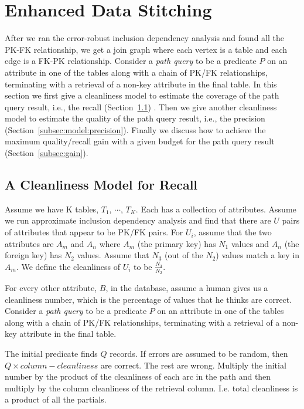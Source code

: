

\section{Enhanced Data Stitching}\label{sec:enhancedstitching}


After we ran the error-robust inclusion dependency analysis and found all the PK-FK relationship, we get a join graph where each vertex is a table and each edge is a FK-PK relationship. Consider a \emph{path query} to be a predicate $P$ on an attribute in one of the tables along with a chain of PK/FK relationships, terminating with a retrieval of a non-key attribute in the final table. 
In this section we first give a cleanliness model to estimate the coverage of the path query result, i.e., the recall (Section~\ref{subsec:model:recall}) . Then we give another cleanliness model to estimate the quality of the path query result, i.e., the precision (Section~\ref{subsec:model:precision}). Finally we discuss how to achieve the maximum quality/recall gain with a given budget for the path query result (Section~\ref{subsec:gain}).

\subsection{A Cleanliness Model for Recall}\label{subsec:model:recall}

Assume we have K tables, $T_1$, $\cdots$, $T_K$.  Each has a collection of attributes. Assume we run approximate inclusion dependency analysis and find that there are $U$ pairs of attributes that appear to be PK/FK pairs.  For $U_i$, assume that the two attributes are $A_m$ and $A_n$ where $A_m$ (the primary key) has $N_1$ values and $A_n$ (the foreign key) has $N_2$ values. Assume that $N_3$ (out of the $N_2$) values match a key in $A_m$. We define the cleanliness of $U_i$ to be $\frac{N_3}{N_2}$.

For every other attribute, $B$, in the database, assume a human gives us a cleanliness number, which is the percentage of values that he thinks are correct. Consider a \emph{path query} to be a predicate $P$ on an attribute in one of the tables along with a chain of PK/FK relationships, terminating with a retrieval of a non-key attribute in the final table.

The initial predicate finds $Q$ records. If errors are assumed to be random, then $Q \times column-cleanliness$ are correct. The rest are wrong.  Multiply the initial number by the product of the cleanliness of each arc in the path and then multiply by the column cleanliness of the retrieval column. I.e. total cleanliness is a product of all the partials.



